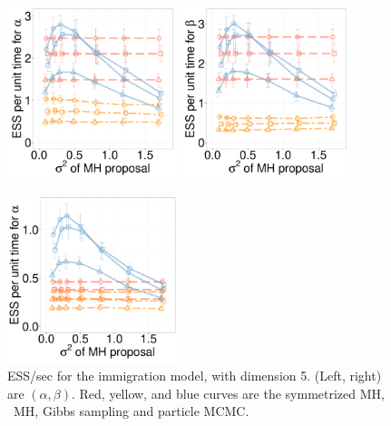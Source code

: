 \begin{figure}[H]
 \begin{minipage}[hp]{0.65\linewidth}
  \centering
    \includegraphics [width=0.44\textwidth, angle=0]{figs/new_whole_exp_figs/q_alpha_dim5.pdf}
    \includegraphics [width=0.44\textwidth, angle=0]{figs/new_whole_exp_figs/q_beta_dim5.pdf}
  \end{minipage}
  \begin{minipage}[!hp]{0.33\linewidth}
    \caption{ESS/sec for the immigration model, with dimension 5. (Left, 
      right) are $(\alpha, \beta)$. Red, yellow, and blue curves are the symmetrized MH,
  \naive\ MH, Gibbs sampling and particle MCMC.}
     \label{fig:ESS_Q_D55}
  \end{minipage}
  \centering
  \begin{minipage}[!hp]{0.65\linewidth}
  \centering
    \includegraphics [width=0.44\textwidth, angle=0]{figs/new_whole_exp_figs/cq_alpha_dim5.pdf}

\end{minipage}
\end{figure}
